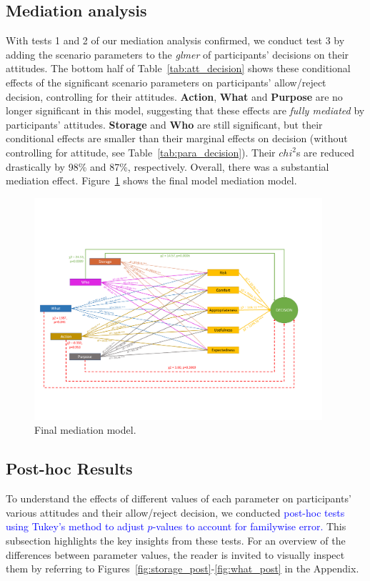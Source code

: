 \subsection{Mediation analysis}
With tests 1 and 2 of our mediation analysis confirmed, we conduct test 3 by adding the scenario parameters to the \emph{glmer} of participants' decisions on their attitudes. The bottom half of Table~\ref{tab:att_decision} shows these conditional effects of the significant scenario parameters on participants' allow/reject decision, controlling for their attitudes. \textbf{Action}, \textbf{What} and \textbf{Purpose} are no longer significant in this model, suggesting that these effects are \emph{fully mediated} by participants' attitudes. \textbf{Storage} and \textbf{Who} are still significant, but their conditional effects are smaller than their marginal effects on decision (without controlling for attitude, see Table~\ref{tab:para_decision}). Their $chi^2$s are reduced drastically by 98\% and 87\%, respectively. Overall, there was a substantial mediation effect. Figure~\ref{fig:mediation_model} shows the final model mediation model.

\begin{figure}
	\centering
	\includegraphics[width=0.95\textwidth]{figures/mediation.pdf}
	\caption{Final mediation model.}
	\label{fig:mediation_model}
\end{figure}


\subsection{Post-hoc Results}
To understand the effects of different values of each parameter on participants' various attitudes and their allow/reject decision, we conducted \textcolor{blue}{post-hoc tests using Tukey's method to adjust $p$-values to account for familywise error.} This subsection highlights the key insights from these tests. For an overview of the differences between parameter values, the reader is invited to visually inspect them by referring to Figures~\ref{fig:storage_post}-\ref{fig:what_post} in the Appendix.

